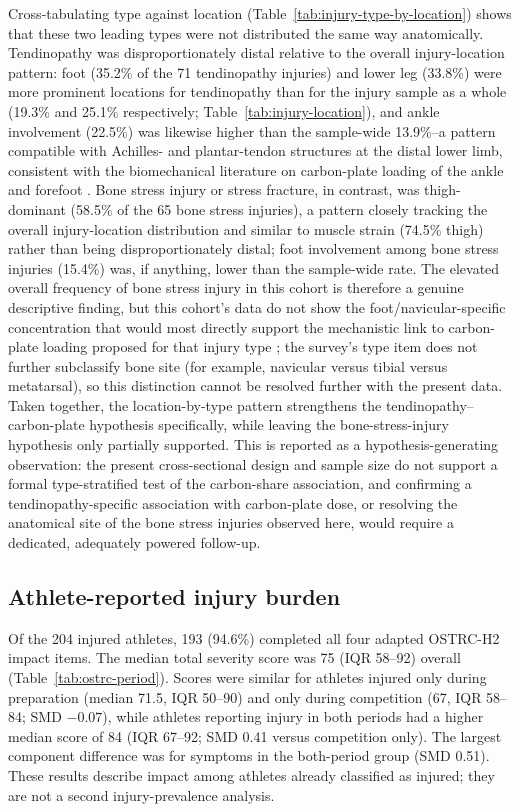 Cross-tabulating type against location (Table~\ref{tab:injury-type-by-location}) shows that these two leading types were not distributed the same way anatomically. Tendinopathy was disproportionately distal relative to the overall injury-location pattern: foot (35.2\% of the 71 tendinopathy injuries) and lower leg (33.8\%) were more prominent locations for tendinopathy than for the injury sample as a whole (19.3\% and 25.1\% respectively; Table~\ref{tab:injury-location}), and ankle involvement (22.5\%) was likewise higher than the sample-wide 13.9\%--a pattern compatible with Achilles- and plantar-tendon structures at the distal lower limb, consistent with the biomechanical literature on carbon-plate loading of the ankle and forefoot \citep{gerlach2025aft}. Bone stress injury or stress fracture, in contrast, was thigh-dominant (58.5\% of the 65 bone stress injuries), a pattern closely tracking the overall injury-location distribution and similar to muscle strain (74.5\% thigh) rather than being disproportionately distal; foot involvement among bone stress injuries (15.4\%) was, if anything, lower than the sample-wide rate. The elevated overall frequency of bone stress injury in this cohort is therefore a genuine descriptive finding, but this cohort's data do not show the foot/navicular-specific concentration that would most directly support the mechanistic link to carbon-plate loading proposed for that injury type \citep{tenforde2023bonestress}; the survey's type item does not further subclassify bone site (for example, navicular versus tibial versus metatarsal), so this distinction cannot be resolved further with the present data. Taken together, the location-by-type pattern strengthens the tendinopathy--carbon-plate hypothesis specifically, while leaving the bone-stress-injury hypothesis only partially supported. This is reported as a hypothesis-generating observation: the present cross-sectional design and sample size do not support a formal type-stratified test of the carbon-share association, and confirming a tendinopathy-specific association with carbon-plate dose, or resolving the anatomical site of the bone stress injuries observed here, would require a dedicated, adequately powered follow-up.

\subsection{Athlete-reported injury burden}
\label{sec:results-ostrc}
Of the 204 injured athletes, 193 (94.6\%) completed all four adapted OSTRC-H2 impact items. The median total severity score was 75 (IQR 58--92) overall (Table~\ref{tab:ostrc-period}). Scores were similar for athletes injured only during preparation (median 71.5, IQR 50--90) and only during competition (67, IQR 58--84; SMD $-0.07$), while athletes reporting injury in both periods had a higher median score of 84 (IQR 67--92; SMD 0.41 versus competition only). The largest component difference was for symptoms in the both-period group (SMD 0.51). These results describe impact among athletes already classified as injured; they are not a second injury-prevalence analysis.

